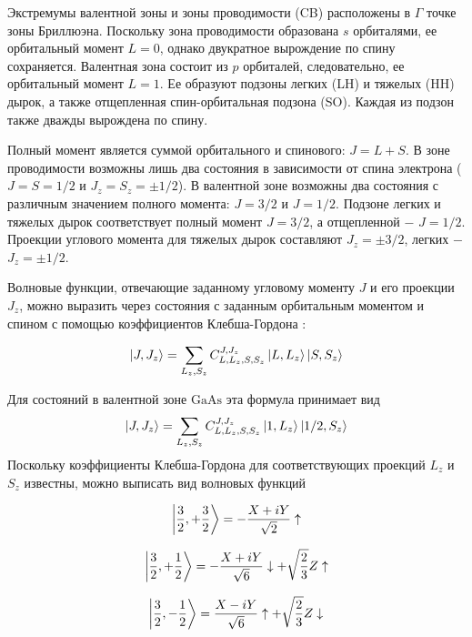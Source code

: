 \documentclass[14pt]{extarticle}
\newcommand{\gaas}{\mathrm{Ga}\mathrm{As}}
\numberwithin{equation}{section}
\begin{document}
Экстремумы валентной зоны и зоны проводимости (CB) расположены в $\Gamma$ точке зоны Бриллюэна.  Поскольку зона проводимости образована $s$ орбиталями, ее орбитальный момент $L = 0$, однако двукратное вырождение по спину сохраняется. Валентная зона состоит из $p$ орбиталей, следовательно, ее орбитальный момент $L = 1$. Ее образуют подзоны легких (LH) и тяжелых (HH) дырок, а также отщепленная спин-орбитальная подзона (SO). Каждая из подзон также дважды вырождена по спину. 

Полный момент является суммой орбитального и спинового:  $J = L + S$. В зоне проводимости возможны лишь два состояния в зависимости от спина электрона ($J = S = 1/2$ и  $J_z = S_z = \pm  1/2$). В валентной зоне возможны два состояния с различным значением полного момента: $J = 3/2$ и $J = 1/2$.  Подзоне легких и тяжелых дырок соответствует полный момент $J= 3/2$, а отщепленной $-$ $J = 1/2$. Проекции углового момента для тяжелых дырок составляют $J_z =\pm 3/2$, легких $-$ $J_z = \pm 1/2$.

Волновые функции, отвечающие заданному угловому моменту $J$ и его проекции $J_z$, можно выразить через состояния с заданным орбитальным моментом и спином с помощью коэффициентов Клебша-Гордона  \cite{landau_lifshitz_2004}:

\begin{equation}
\ket{J,J_z} = \sum_{L_z,S_z}C_{L,L_z, S,S_z}^{J,J_z}\ket{L,L_z}\ket{S,S_z}
\end{equation}

Для состояний в валентной зоне $\gaas$ эта формула принимает вид 
\begin{equation}
\ket{J,J_z} = \sum_{L_z,S_z}C_{L,L_z, S,S_z}^{J,J_z}\ket{1,L_z}\ket{1/2,S_z}
\end{equation}
Поскольку коэффициенты Клебша-Гордона для соответствующих проекций $L_z$ и $S_z$ известны, можно выписать вид волновых функций \cite{zakharchenya_opt_or}

\begin{equation}
\ket{\frac{3}{2}, +\frac{3}{2}} = - \frac{X + iY}{\sqrt{2}} \uparrow
\end{equation}

\begin{equation}
\ket{\frac{3}{2}, +\frac{1}{2}} =  - \frac{X + iY}{\sqrt{6}}\downarrow + \sqrt{\frac{2}{3}}Z \uparrow
\end{equation}

\begin{equation}
\ket{\frac{3}{2}, -\frac{1}{2}} =  \frac{X - iY}{\sqrt{6}}\uparrow + \sqrt{\frac{2}{3}}Z \downarrow 
\end{equation}
\end{document}
